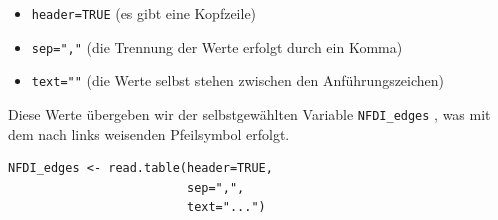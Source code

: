 \documentclass[11pt]{article}
\providecommand{\tightlist}{%
      \setlength{\itemsep}{0pt}\setlength{\parskip}{0pt}}
\begin{document}
\begin{itemize}
\tightlist
\item
  \texttt{header=TRUE} (es gibt eine Kopfzeile)
\item
  \texttt{sep=","} (die Trennung der Werte erfolgt durch ein Komma)
\item
  \texttt{text=""} (die Werte selbst stehen zwischen den
  Anführungszeichen)
\end{itemize}

Diese Werte übergeben wir der selbstgewählten Variable
\texttt{NFDI\_edges} , was mit dem nach links weisenden Pfeilsymbol
erfolgt.

\begin{verbatim}
NFDI_edges <- read.table(header=TRUE,
                         sep=",",
                         text="...")
\end{verbatim}
\end{document}

